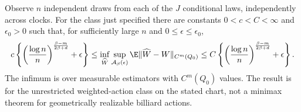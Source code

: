 \begin{theorem}
\label{thm:v79-minimax}
Observe $n$ independent draws from each of the $J$ conditional laws,
independently across clocks.  For the class just specified there are
constants $0<c<C<\infty$ and $\epsilon_0>0$ such that, for sufficiently
large $n$ and $0\le\epsilon\le\epsilon_0$,
\begin{equation}\label{eq:v79-minimax}
 c\left\{\left(\frac{\log n}{n}\right)^\frac{\beta-m}{2\beta+d}
                      +\epsilon\right\}
 \le \inf_{\widehat W}\sup_{\mathcal A_\beta(\epsilon)}
       \E\|\widehat W-W\|_{C^m(Q_0)}
 \le C\left\{\left(\frac{\log n}{n}\right)^\frac{\beta-m}{2\beta+d}
                      +\epsilon\right\}.
\end{equation}
The infimum is over measurable estimators with $C^m(Q_0)$ values.
The result is for the unrestricted weighted-action class on the stated
chart, not a minimax theorem for geometrically realizable billiard actions.
\end{theorem}
